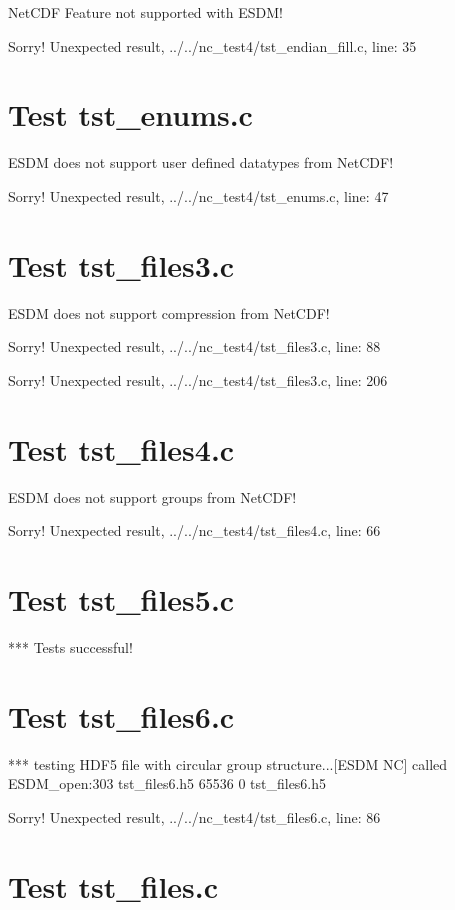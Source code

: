 NetCDF Feature not supported with ESDM!

Sorry! Unexpected result, ../../nc\_test4/tst\_endian\_fill.c, line: 35

\section{Test tst\_enums.c}

ESDM does not support user defined datatypes from NetCDF!

Sorry! Unexpected result, ../../nc\_test4/tst\_enums.c, line: 47

\section{Test tst\_files3.c}

ESDM does not support compression from NetCDF!

Sorry! Unexpected result, ../../nc\_test4/tst\_files3.c, line: 88

Sorry! Unexpected result, ../../nc\_test4/tst\_files3.c, line: 206

\section{Test tst\_files4.c}

ESDM does not support groups from NetCDF!

Sorry! Unexpected result, ../../nc\_test4/tst\_files4.c, line: 66

\section{Test tst\_files5.c}

*** Tests successful!

\section{Test tst\_files6.c}

*** testing HDF5 file with circular group structure...[ESDM NC] called ESDM\_open:303 tst\_files6.h5 65536 0 tst\_files6.h5

Sorry! Unexpected result, ../../nc\_test4/tst\_files6.c, line: 86

\section{Test tst\_files.c}

